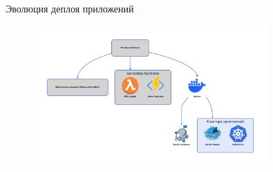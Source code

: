 \begin{frame}{ Эволюция деплоя приложений}

    \begin{figure}
        \centering
        \includegraphics[width=0.8\textwidth]{images/docker.png}
        \label{fig:evolution}
    \end{figure}

\end{frame}




